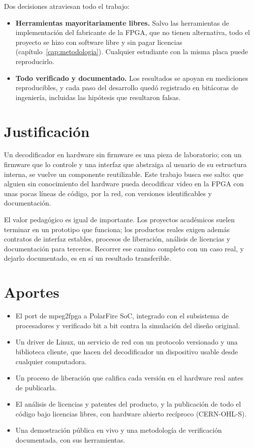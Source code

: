 Dos decisiones atraviesan todo el trabajo:

\begin{itemize}
  \item \textbf{Herramientas mayoritariamente libres.} Salvo las herramientas
    de implementación del fabricante de la FPGA, que no tienen alternativa,
    todo el proyecto se hizo con software libre y sin pagar licencias
    (capítulo~\ref{cap:metodologia}). Cualquier estudiante con la misma placa
    puede reproducirlo.
  \item \textbf{Todo verificado y documentado.} Los resultados se apoyan en
    mediciones reproducibles, y cada paso del desarrollo quedó registrado en
    bitácoras de ingeniería, incluidas las hipótesis que resultaron falsas.
\end{itemize}

\section{Justificación}

Un decodificador en hardware sin firmware es una pieza de laboratorio; con
un firmware que lo controle y una interfaz que abstraiga al usuario de su
estructura interna, se vuelve un componente reutilizable. Este trabajo busca
ese salto: que alguien sin conocimiento del hardware pueda decodificar video
en la FPGA con unas pocas líneas de código, por la red, con versiones
identificables y documentación.

El valor pedagógico es igual de importante. Los proyectos académicos suelen
terminar en un prototipo que funciona; los productos reales exigen además
contratos de interfaz estables, procesos de liberación, análisis de licencias
y documentación para terceros. Recorrer ese camino completo con un caso real,
y dejarlo documentado, es en sí un resultado transferible.

\section{Aportes}

\begin{itemize}
  \item El port de mpeg2fpga a PolarFire SoC, integrado con el subsistema de
    procesadores y verificado bit a bit contra la simulación del diseño
    original.
  \item Un driver de Linux, un servicio de red con un protocolo versionado y
    una biblioteca cliente, que hacen del decodificador un dispositivo usable
    desde cualquier computadora.
  \item Un proceso de liberación que califica cada versión en el hardware
    real antes de publicarla.
  \item El análisis de licencias y patentes del producto, y la publicación de
    todo el código bajo licencias libres, con hardware abierto recíproco
    (CERN-OHL-S).
  \item Una demostración pública en vivo y una metodología de verificación
    documentada, con sus herramientas.
\end{itemize}

